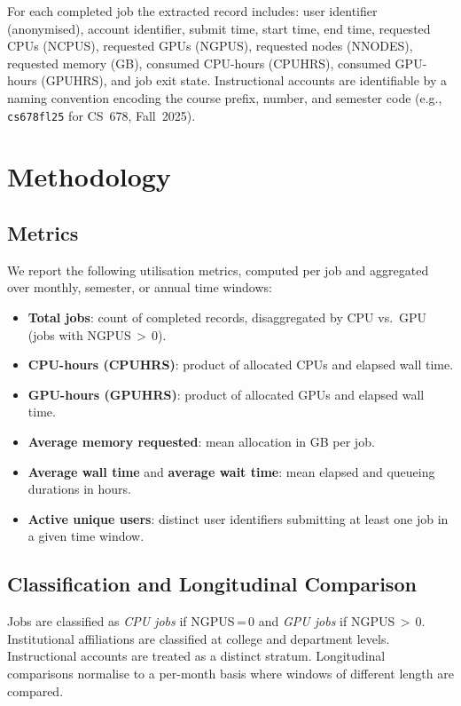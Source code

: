 \documentclass[11pt,letterpaper]{article}
\begin{document}
For each completed job the extracted record includes: user identifier
(anonymised), account identifier, submit time, start time, end time, requested
CPUs (NCPUS), requested GPUs (NGPUS), requested nodes (NNODES), requested
memory (GB), consumed CPU-hours (CPUHRS), consumed GPU-hours (GPUHRS), and job
exit state.  Instructional accounts are identifiable by a naming convention
encoding the course prefix, number, and semester code (e.g., \texttt{cs678fl25}
for CS~678, Fall~2025).

\section{Methodology}
\label{sec:method}

\subsection{Metrics}

We report the following utilisation metrics, computed per job and aggregated over
monthly, semester, or annual time windows:

\begin{itemize}[leftmargin=2em]
  \item \textbf{Total jobs}: count of completed records, disaggregated by CPU
        vs.\ GPU (jobs with NGPUS\,$>$\,0).
  \item \textbf{CPU-hours (CPUHRS)}: product of allocated CPUs and elapsed wall
        time.
  \item \textbf{GPU-hours (GPUHRS)}: product of allocated GPUs and elapsed wall
        time.
  \item \textbf{Average memory requested}: mean allocation in GB per job.
  \item \textbf{Average wall time} and \textbf{average wait time}: mean elapsed
        and queueing durations in hours.
  \item \textbf{Active unique users}: distinct user identifiers submitting at
        least one job in a given time window.
\end{itemize}

\subsection{Classification and Longitudinal Comparison}

Jobs are classified as \emph{CPU jobs} if NGPUS\,=\,0 and \emph{GPU jobs} if
NGPUS\,$>$\,0.  Institutional affiliations are classified at college and
department levels.  Instructional accounts are treated as a distinct stratum.
Longitudinal comparisons normalise to a per-month basis where windows of
different length are compared.
\end{document}
